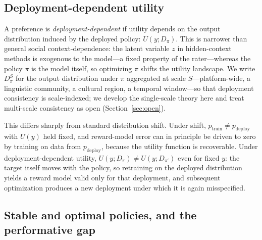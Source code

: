 ﻿\documentclass[11pt]{article}
\begin{document}
\subsection{Deployment-dependent utility}
\label{sec:dd-utility}

A preference is \emph{deployment-dependent} if utility depends on the output distribution induced by the deployed policy: \(U(y; D_\pi)\). This is narrower than general social context-dependence: the latent variable \(z\) in hidden-context methods is exogenous to the model---a fixed property of the rater---whereas the policy \(\pi\) is the model itself, so optimizing \(\pi\) shifts the utility landscape. We write \(D_\pi^S\) for the output distribution under \(\pi\) aggregated at scale \(S\)---platform-wide, a linguistic community, a cultural region, a temporal window---so that deployment consistency is scale-indexed; we develop the single-scale theory here and treat multi-scale consistency as open (Section~\ref{sec:open}).

This differs sharply from standard distribution shift. Under shift, \(p_{\text{train}} \neq p_{\text{deploy}}\) with \(U(y)\) held fixed, and reward-model error can in principle be driven to zero by training on data from \(p_{\text{deploy}}\), because the utility function is recoverable. Under deployment-dependent utility, \(U(y; D_\pi) \neq U(y; D_{\pi'})\) even for fixed \(y\): the target itself moves with the policy, so retraining on the deployed distribution yields a reward model valid only for that deployment, and subsequent optimization produces a new deployment under which it is again misspecified.

\subsection{Stable and optimal policies, and the performative gap}
\label{sec:gap}
\end{document}
